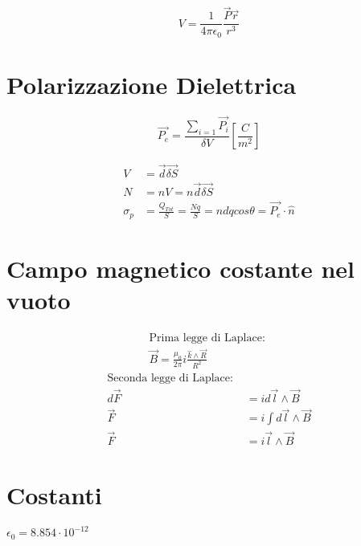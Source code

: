 \documentclass[a4paper,11pt]{article}
\begin{document}
\begin{multicols}{3}
		\begin{equation}
			V = \frac{1}{4 \pi \epsilon_0} \frac{\vec{P}\vec{r}}{r^3}
		\end{equation}
	
		\section{Polarizzazione Dielettrica}
		\begin{equation}
			\vec{P_e} = \frac{\sum_{i=1}\vec{P_i}}{\delta V} \left[\frac{C}{m^2}\right]
		\end{equation}
	
		\begin{align*}
			V &= \vec{d} \vec{\delta S} \\
			N &= nV = n\vec{d} \vec{\delta S} \\
			\sigma_p &= \frac{Q_{Tot}}{S} = \frac{Nq}{S} = ndqcos\theta = \vec{P_e} \cdot \hat{n}
		\end{align*}
	
		\section{Campo magnetico costante nel vuoto}
		\begin{align*}
			\text{Prima legge } \text{di Laplace: } \\
			\vec{B} = \frac{\mu_0}{2\pi} i \frac{\hat{k} \land \vec{R}}{R^2}
		\end{align*}
		\begin{align*}
			\text{Seconda legge di Laplace: } \\
			d\vec{F} &= id\vec{l} \land \vec{B} \\
			\vec{F} &= i\int d\vec{l} \land \vec{B} \\
			\vec{F} &= i\vec{l} \land \vec{B}
		\end{align*}
	
	
	
	
	
	
	
	
	
	
	
	
	
	
	
	
	
		
		
		\section{Costanti}
		$\epsilon_{0}=8.854 \cdot 10^{-12}$
		

\end{multicols}
\end{document}
